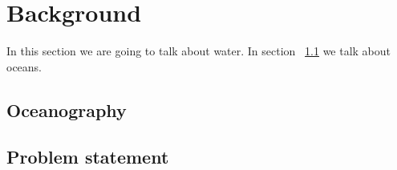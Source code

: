 \section{Background}

In this section we are going to talk about water. In section
~\ref{subsec:oceanogrphy} we talk about oceans.

\subsection{Oceanography}\label{subsec:oceanogrphy}
\subsection{Problem statement}
